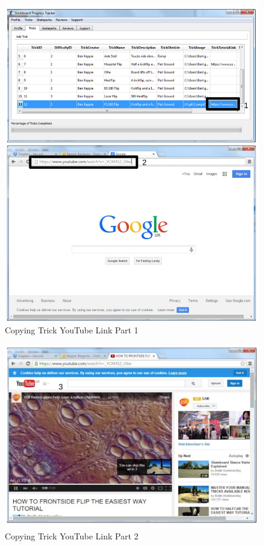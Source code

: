 \begin{figure}[H]
    \includegraphics[width=\textwidth]{./Evaluation/images/LoadYouTube.pdf}
    \caption{Copying Trick YouTube Link Part 1} \label{fig:loadYouTube1}
\end{figure}

\begin{figure}[H]
    \includegraphics[width=\textwidth]{./Evaluation/images/LoadYouTube2.pdf}
    \caption{Copying Trick YouTube Link Part 2} \label{fig:loadYouTube2}
\end{figure}

